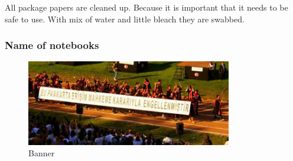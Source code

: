 All package papers are cleaned up. Because it is important that it needs to be safe to use. With mix of water and little bleach they are swabbed. 

\subsubsection{Name of notebooks}
  \begin{figure}[ht]
      \centering
      \includegraphics[width=0.8\textwidth]{project_graphics/banner1.jpg}
      \caption{Banner}
      \label{fig:Banner_1}
  \end{figure}
